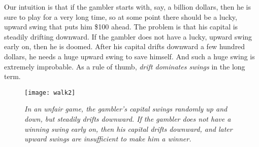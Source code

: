 Our intuition is that if the gambler starts with, say, a billion dollars,
then he is sure to play for a very long time, so at some point there
should be a lucky, upward swing that puts him \$100 ahead.  The problem is
that his capital is steadily drifting downward.  If the gambler does not
have a lucky, upward swing early on, then he is doomed.  After his capital
drifts downward a few hundred dollars, he needs a huge upward swing to
save himself.  And such a huge swing is extremely improbable.  As a rule
of thumb, \emph{drift dominates swings} in the long term.

\begin{figure}
\centerline{\texttt{[image: walk2]}}
\caption{\em In an unfair game, the gambler's capital swings randomly up
and down, but steadily drifts downward.  If the gambler does not have
a winning swing early on, then his capital drifts downward, and later
upward swings are insufficient to make him a winner.}
\label{LN12:fig:walk2}
\end{figure}


